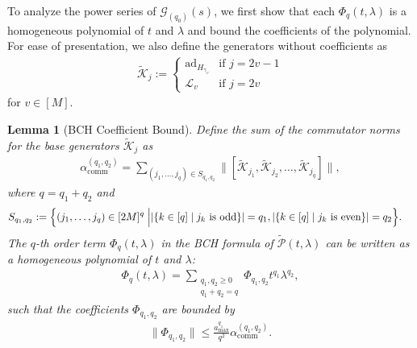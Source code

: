 \documentclass[11pt]{article}
\newtheorem{lemma}{Lemma}
\newcommand{\ad}{\mathrm{ad}}
\renewcommand{\P}{\mathcal{P}}
\newcommand{\G}{\mathcal{G}}
\renewcommand{\comm}{\mathrm{comm}}
\newcommand{\mc}{\mathcal}
\begin{document}
To analyze the power series of $\G_{(q_0)}(s)$, we first show that each $\Phi_q(t,\lambda)$ is a homogeneous polynomial of $t$ and $\lambda$ and bound the coefficients of the polynomial. For ease of presentation, we also define the generators without coefficients as
\begin{align}
\label{eq:def-K-tilde}
 	\tilde{\mathcal{K}}_j := \begin{cases}\ad_{H_{\gamma_v}} & \text{if } j = 2v-1\\ \mathcal{L}_v & \text{if } j = 2v \end{cases}
\end{align}
for $v \in [M]$.
\begin{lemma}[BCH Coefficient Bound]
\label{lem:bch-bound}
 	Define the sum of the commutator norms for the base generators $\tilde{\mc K}_j$ as
 	\begin{align}
 	\label{eq:alpha-q-q}
 	\alpha_{\comm}^{(q_1, q_2)}=\sum_{(j_1, \ldots, j_q)\in S_{q_1, q_2}}\big\|[\tilde{\mc K}_{j_1}, \tilde{\mc K}_{j_2},\ldots,\tilde{\mc K}_{j_q}]\big\|,
 	\end{align}
 	where $q = q_1+q_2$ and
 	\begin{align}
 	\label{eq:S-q-q}
 	 	S_{q_1, q_2}:=\Bigl\{(j_1, \ldots, j_q)\in [2M]^q\Bigm| &|\{k\in [q]\mid j_k \text{ is odd}\}|=q_1, |\{k\in [q]\mid j_k \text{ is even}\}|=q_2\Bigr\}. \nonumber
 	\end{align}
 	The $q$-th order term $\Phi_q(t,\lambda)$ in the BCH formula of $\tilde{\P}(t,\lambda)$ can be written as a homogeneous polynomial of $t$ and $\lambda$:
 	\begin{align}
 	\Phi_q(t,\lambda) = \sum_{\substack{q_1, q_2 \ge 0\\q_1+q_2 = q}}\Phi_{q_1, q_2} t^{q_1}\lambda^{q_2},
 	\end{align}
 	such that the coefficients $\Phi_{q_1, q_2}$ are bounded by
 	\begin{align}
 	\|\Phi_{q_1, q_2}\|\le \frac{a_{\max}^{q_1}}{q^2}\alpha_{\comm}^{(q_1, q_2)}.
 	\end{align}
\end{lemma}
\end{document}
